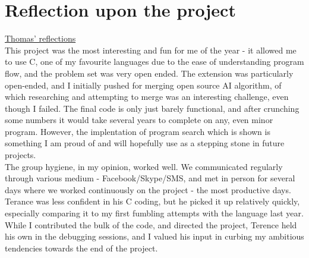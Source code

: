 \documentclass[11pt]{article}
\begin{document}
\section{Reflection upon the project}
\underline{Thomas' reflections}
\\
\indent This project was the most interesting and fun for me of the year - it allowed me to use C, one of my favourite languages due to the ease of understanding program flow, and the problem set was very open ended. The extension was particularly open-ended, and I initially pushed for merging open source AI algorithm, of which researching and attempting to merge was an interesting challenge, even though I failed. The final code is only just barely functional, and after crunching some numbers it would take several years to complete on any, even minor program. However, the implentation of program search which is shown is something I am proud of and will hopefully use as a stepping stone in future projects.
\\
\indent The group hygiene, in my opinion, worked well. We communicated regularly through various medium - Facebook/Skype/SMS, and met in person for several days where we worked continuously on the project - the most productive days. Terance was less confident in his C coding, but he picked it up relatively quickly, especially comparing it to my first fumbling attempts with the language last year. While I contributed the bulk of the code, and directed the project, Terence held his own in the debugging sessions, and I valued his input in curbing my ambitious tendencies towards the end of the project. 
\\
\end{document}
